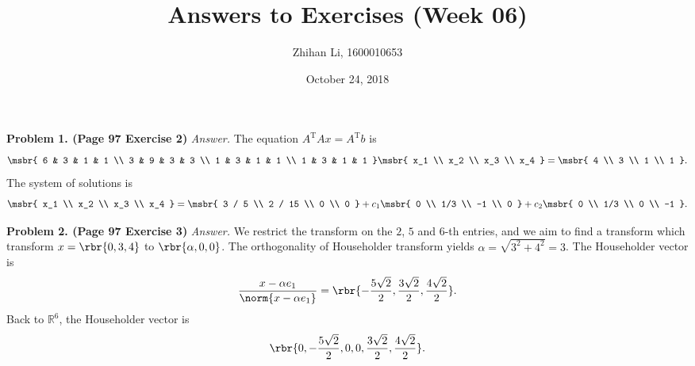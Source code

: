 \documentclass[english, nochinese]{pnote}
\title{Answers to Exercises (Week 06)}
\author{Zhihan Li, 1600010653}
\date{October 24, 2018}
\begin{document}
\maketitle

\textbf{Problem 1. (Page 97 Exercise 2)} \textit{Answer.} The equation $ A^{\text{T}} A x = A^{\text{T}} b $ is
\begin{equation}
\msbr{ 6 & 3 & 1 & 1 \\ 3 & 9 & 3 & 3 \\ 1 & 3 & 1 & 1 \\ 1 & 3 & 1 & 1 } \msbr{ x_1 \\ x_2 \\ x_3 \\ x_4 } = \msbr{ 4 \\ 3 \\ 1 \\ 1 }.
\end{equation}
The system of solutions is
\begin{equation}
\msbr{ x_1 \\ x_2 \\ x_3 \\ x_4 } = \msbr{ 3 / 5 \\ 2 / 15 \\ 0 \\ 0 } + c_1 \msbr{ 0 \\ 1/3 \\ -1 \\ 0 } + c_2 \msbr{ 0 \\ 1/3 \\ 0 \\ -1 }.
\end{equation}

\textbf{Problem 2. (Page 97 Exercise 3)} \textit{Answer.} We restrict the transform on the $2$, $5$ and $6$-th entries, and we aim to find a transform which transform $ x = \rbr{ 0, 3, 4 } $ to $ \rbr{ \alpha, 0, 0 } $. The orthogonality of Householder transform yields $ \alpha = \sqrt{ 3^2 + 4^2 } = 3 $. The Householder vector is
\begin{equation}
\frac{ x - \alpha e_1 }{\norm{ x - \alpha e_1 }} = \rbr{ -\frac{ 5 \sqrt{2} }{2}, \frac{ 3 \sqrt{2} }{2}, \frac{ 4 \sqrt{2} }{2} }.
\end{equation}
Back to $\mathbb{R}^6$, the Householder vector is
\begin{equation}
\rbr{ 0, -\frac{ 5 \sqrt{2} }{2}, 0, 0, \frac{ 3 \sqrt{2} }{2}, \frac{ 4 \sqrt{2} }{2} }.
\end{equation}
\end{document}
